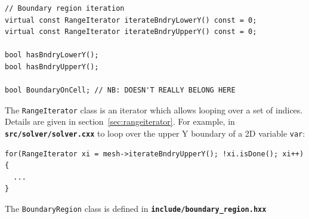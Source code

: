\documentclass[12pt]{article}
\newcommand{\code}[1]{\texttt{#1}}
\newcommand{\file}[1]{\texttt{\bf #1}}
\begin{document}
%
\begin{lstlisting}
// Boundary region iteration
virtual const RangeIterator iterateBndryLowerY() const = 0;
virtual const RangeIterator iterateBndryUpperY() const = 0;

bool hasBndryLowerY();
bool hasBndryUpperY();

bool BoundaryOnCell; // NB: DOESN'T REALLY BELONG HERE
\end{lstlisting}
%
The \code{RangeIterator} class is an iterator
%
%
which allows looping over a set of indices. Details are given in
section~\ref{sec:rangeiterator}. For example, in \file{src/solver/solver.cxx}
to loop over the upper Y boundary of a 2D variable \code{var}:
%
\begin{lstlisting}
for(RangeIterator xi = mesh->iterateBndryUpperY(); !xi.isDone(); xi++) {
  ...
}
\end{lstlisting}
%
The
%
\lstinline!BoundaryRegion!
%
 class is defined in \file{include/boundary\_region.hxx}
\end{document}
